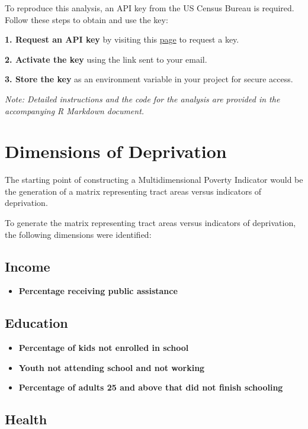 \documentclass[
  letterpaper,
  DIV=11,
  numbers=noendperiod]{scrreprt}
\providecommand{\tightlist}{%
  \setlength{\itemsep}{0pt}\setlength{\parskip}{0pt}}\usepackage{longtable,booktabs,array}
\begin{document}
To reproduce this analysis, an API key from the US Census Bureau is
required. Follow these steps to obtain and use the key:

\textbf{1. Request an API key} by visiting this
\href{https://api.census.gov/data/key_signup.html}{page} to request a
key.

\textbf{2. Activate the key} using the link sent to your email.

\textbf{3. Store the key} as an environment variable in your project for
secure access.

\emph{Note: Detailed instructions and the code for the analysis are
provided in the accompanying R Markdown document.}

\section{Dimensions of Deprivation}\label{dimensions-of-deprivation}

The starting point of constructing a Multidimensional Poverty Indicator
would be the generation of a matrix representing tract areas versus
indicators of deprivation.

To generate the matrix representing tract areas versus indicators of
deprivation, the following dimensions were identified:

\subsection{Income}\label{income}

\begin{itemize}
\tightlist
\item
  \textbf{Percentage receiving public assistance}
\end{itemize}

\subsection{Education}\label{education}

\begin{itemize}
\tightlist
\item
  \textbf{Percentage of kids not enrolled in school}
\item
  \textbf{Youth not attending school and not working}
\item
  \textbf{Percentage of adults 25 and above that did not finish
  schooling}
\end{itemize}

\subsection{Health}\label{health}
\end{document}
